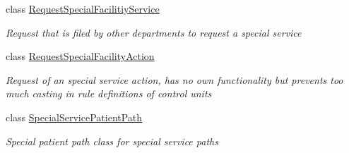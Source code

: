 \begin{DoxyCompactItemize}
\item 
class \hyperlink{class_general_health_care_elements_1_1_special_facility_1_1_request_special_facilitiy_service}{Request\+Special\+Facilitiy\+Service}
\begin{DoxyCompactList}\small\item\em Request that is filed by other departments to request a special service \end{DoxyCompactList}\item 
class \hyperlink{class_general_health_care_elements_1_1_special_facility_1_1_request_special_facility_action}{Request\+Special\+Facility\+Action}
\begin{DoxyCompactList}\small\item\em Request of an special service action, has no own functionality but prevents too much casting in rule definitions of control units \end{DoxyCompactList}\item 
class \hyperlink{class_general_health_care_elements_1_1_special_facility_1_1_special_service_patient_path}{Special\+Service\+Patient\+Path}
\begin{DoxyCompactList}\small\item\em Special patient path class for special service paths \end{DoxyCompactList}\end{DoxyCompactItemize}
